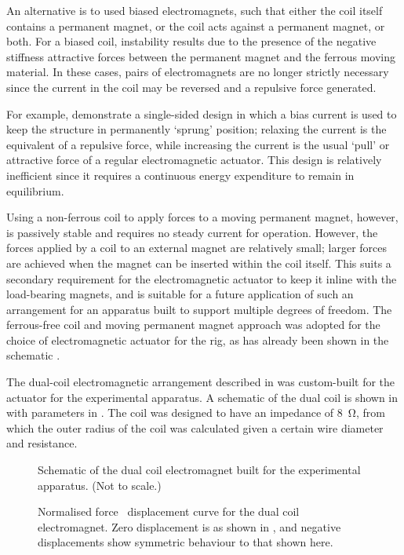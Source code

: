 \documentclass[11pt,a4paper]{memoir}
\begin{document}
An alternative is to used biased electromagnets, such that either the coil
itself contains a permanent magnet, or the coil acts against a permanent
magnet, or both. For a biased coil, instability results due to the presence of
the negative stiffness attractive forces between the permanent magnet and the
ferrous moving material. In these cases, pairs of electromagnets are no longer
strictly necessary since the current in the coil may be reversed and a
repulsive force generated.

For example, \textcite{nandi2009} demonstrate a single-sided design in which a
bias current is used to keep the structure in permanently `sprung' position;
relaxing the current is the equivalent of a repulsive force, while increasing
the current is the usual `pull' or attractive force of a regular
electromagnetic actuator. This design is relatively inefficient since it
requires a continuous energy expenditure to remain in equilibrium.

Using a non-ferrous coil to apply forces to a moving permanent magnet,
however, is passively stable and requires no steady current for operation.
However, the forces applied by a coil to an external magnet are relatively
small; larger forces are achieved when the magnet can be inserted within the
coil itself. This suits a secondary requirement for the electromagnetic
actuator to keep it inline with the load-bearing magnets, and is suitable for a
future application of such an arrangement for an apparatus built to support
multiple degrees of freedom. The ferrous-free coil and moving permanent magnet
approach was adopted for the choice of electromagnetic actuator for the rig,
as has already been shown in the schematic .

The dual-coil electromagnetic arrangement described in  was
custom-built for the actuator for the experimental apparatus. A schematic of
the dual coil is shown in  with parameters in
. The coil was designed to have an impedance of
\SI{8}{\ohm}, from which the outer radius of the coil was calculated given a
certain wire diameter and resistance.

\begin{figure}
  \begin{wide}
  \begin{sidefigure}
  \caption{Schematic of the dual coil electromagnet built for the experimental apparatus. (Not to scale.)
  }
  \end{sidefigure}\hfill
  \begin{sidefigure}
  \caption{Normalised force \vs\  displacement curve for the dual coil electromagnet. Zero displacement is as shown in , and
  negative displacements show symmetric behaviour to that shown here.
  }
\end{sidefigure}
  \end{wide}
\end{figure}
\end{document}
